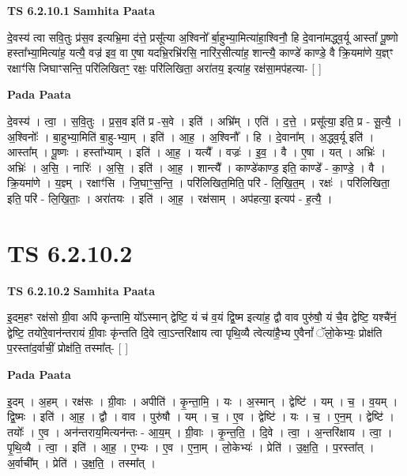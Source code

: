 \documentclass[17pt]{extarticle}
\begin{document}
\textbf{TS 6.2.10.1 } \newline
\textbf{Samhita Paata} \newline

दे॒वस्य॑ त्वा सवि॒तुः प्र॑स॒व इत्यभ्रि॒मा द॑त्ते॒ प्रसू᳚त्या अ॒श्विनो᳚ र्बा॒हुभ्या॒मित्या॑हा॒श्विनौ॒ हि दे॒वाना॑मद्ध्व॒र्यू आस्तां᳚ पू॒ष्णो हस्ता᳚भ्या॒मित्या॑ह॒ यत्यै॒ वज्र॑ इव॒ वा ए॒षा यदभ्रि॒रभ्रि॑रसि॒ नारि॑र॒सीत्या॑ह॒ शान्त्यै॒ काण्डे॑ काण्डे॒ वै क्रि॒यमा॑णे य॒ज्ञ्ꣳ रक्षाꣳ॑सि जिघाꣳसन्ति॒ परि॑लिखितꣳ॒॒ रक्षः॒ परि॑लिखिता॒ अरा॑तय॒ इत्या॑ह॒ रक्ष॑सा॒मप॑हत्या- [  ] \newline

\textbf{Pada Paata} \newline

दे॒वस्य॑ । त्वा॒ । स॒वि॒तुः । प्र॒स॒व इति॑ प्र -स॒वे । इति॑ । अभ्रि᳚म् । एति॑ । द॒त्ते॒ । प्रसू᳚त्या॒ इति॒ प्र - सू॒त्यै॒ । अ॒श्विनोः᳚ । बा॒हुभ्या॒मिति॑ बा॒हु-भ्या॒म् । इति॑ । आ॒ह॒ । अ॒श्विनौ᳚ । हि । दे॒वाना᳚म् । अ॒द्ध्व॒र्यू इति॑ । आस्ता᳚म् । पू॒ष्णः । हस्ता᳚भ्याम् । इति॑ । आ॒ह॒ । यत्यै᳚ । वज्रः॑ । इ॒व॒ । वै । ए॒षा । यत् । अभ्रिः॑ । अभ्रिः॑ । अ॒सि॒ । नारिः॑ । अ॒सि॒ । इति॑ । आ॒ह॒ । शान्त्यै᳚ । काण्डे॑काण्ड॒ इति॒ काण्डे᳚ - का॒ण्डे॒ । वै । क्रि॒यमा॑णे । य॒ज्ञ्म् । रक्षाꣳ॑सि । जि॒घाꣳ॒॒स॒न्ति॒ । परि॑लिखित॒मिति॒ परि॑ - लि॒खि॒त॒म् । रक्षः॑ । परि॑लिखिता॒ इति॒ परि॑ - लि॒खि॒ताः॒ । अरा॑तयः । इति॑ । आ॒ह॒ । रक्ष॑साम् । अप॑हत्या॒ इत्यप॑ - ह॒त्यै॒ ।  \newline





\section{ TS 6.2.10.2 }

\textbf{TS 6.2.10.2 } \newline
\textbf{Samhita Paata} \newline

इ॒दम॒हꣳ रक्ष॑सो ग्री॒वा अपि॑ कृन्तामि॒ यो᳚ऽस्मान् द्वेष्टि॒ यं च॑ व॒यं द्वि॒ष्म इत्या॑ह॒ द्वौ वाव पुरु॑षौ॒ यं चै॒व द्वेष्टि॒ यश्चै॑नं॒ द्वेष्टि॒ तयो॑रे॒वान॑न्तरायं ग्री॒वाः कृ॑न्तति दि॒वे त्वा॒ऽन्तरि॑क्षाय त्वा पृथि॒व्यै त्वेत्या॑है॒भ्य ए॒वैनां᳚ ॅलो॒केभ्यः॒ प्रोक्ष॑ति प॒रस्ता॑द॒र्वाचीं॒ प्रोक्ष॑ति॒ तस्मा᳚त्- [  ] \newline

\textbf{Pada Paata} \newline

इ॒दम् । अ॒हम् । रक्ष॑सः । ग्री॒वाः । अपीति॑ । कृ॒न्ता॒मि॒ । यः । अ॒स्मान् । द्वेष्टि॑ । यम् । च॒ । व॒यम् । द्वि॒ष्मः । इति॑ । आ॒ह॒ । द्वौ । वाव । पुरु॑षौ । यम् । च॒ । ए॒व । द्वेष्टि॑ । यः । च॒ । ए॒न॒म् । द्वेष्टि॑ । तयोः᳚ । ए॒व । अन॑न्तराय॒मित्यन॑न्तः - आ॒य॒म् । ग्री॒वाः । कृ॒न्त॒ति॒ । दि॒वे । त्वा॒ । अ॒न्तरि॑क्षाय । त्वा॒ । पृ॒थि॒व्यै । त्वा॒ । इति॑ । आ॒ह॒ । ए॒भ्यः । ए॒व । ए॒ना॒म् । लो॒केभ्यः॑ । प्रेति॑ । उ॒क्ष॒ति॒ । प॒रस्ता᳚त् । अ॒र्वाची᳚म् । प्रेति॑ । उ॒क्ष॒ति॒ । तस्मा᳚त् ।  \newline
\end{document}
